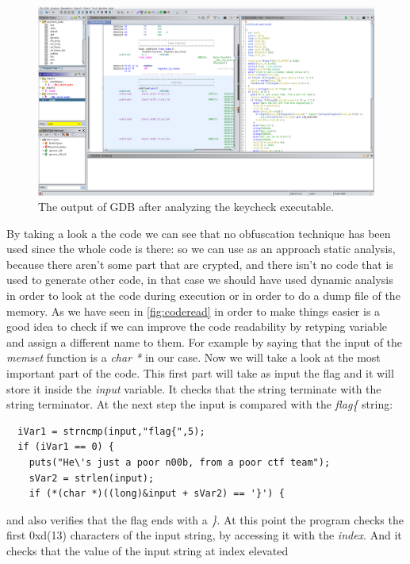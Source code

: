 \documentclass{article}
\begin{document}
\begin{figure}[htp]
    \centering
    \includegraphics[width=1\textwidth]{images/ghidrakeycheck.png}
    \caption{The output of GDB after analyzing the keycheck executable.}
    \label{fig:keycheckgdb}
\end{figure}
By taking a look a the code we can see that no obfuscation technique has been used since the whole code is there: so we can use as an approach static analysis, because there aren't some part that are crypted, and there isn't no code that is used to generate other code, in that case we should have used dynamic analysis
in order to look at the code during execution or in order to do a dump file of the memory.
As we have seen in \ref{fig:coderead} in order to make things easier is a good idea to check if we can improve the code readability by retyping variable and assign a different name to them.
For example by saying that the input of the \textit{memset} function is a \textit{char *} in our case.
Now we will take a look at the most important part of the code.
This first part will take as input the flag and it will store it inside the \textit{input} variable. It checks that the string terminate with the string terminator.
At the next step the input is compared with the \textit{flag\{} string:
\begin{verbatim}
  iVar1 = strncmp(input,"flag{",5);
  if (iVar1 == 0) {
    puts("He\'s just a poor n00b, from a poor ctf team");
    sVar2 = strlen(input);
    if (*(char *)((long)&input + sVar2) == '}') {
\end{verbatim}
and also verifies that the flag ends with a \textit{\}}.
At this point the program checks the first 0xd(13) characters of the input string, by accessing it with the \textit{index}. And it checks that the value of the input string at index elevated
\end{document}
